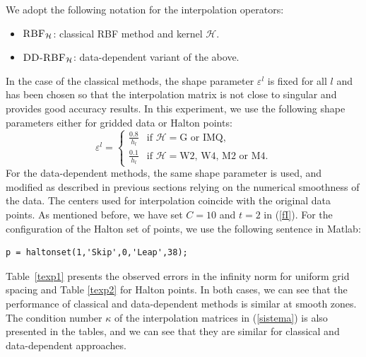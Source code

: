 \documentclass[preprint]{elsarticle}       %
\begin{document}
We adopt the following notation for the interpolation operators:
\begin{itemize}
    \item $\textsc{RBF}_{\mathcal{H}}$: classical RBF method and kernel $\mathcal{H}$.
    \item $\textsc{DD-RBF}_{\mathcal{H}}$: data-dependent variant of the above.
\end{itemize}
In the case of the classical methods, the shape parameter $\varepsilon^l$ is fixed for all $l$ and has been chosen so that the interpolation matrix is not close to singular and provides good accuracy results. In this experiment, we use the following shape parameters either for gridded data or Halton points:
\[
\varepsilon^l = 
\begin{cases}
\frac{0.8}{h_l} & \text{if } \mathcal{H} = \text{G or IMQ}, \\
\frac{0.1}{h_l} & \text{if } \mathcal{H} = \text{W2, W4, M2 or M4}.
\end{cases}
\]
For the data-dependent methods, the same shape parameter is used, and modified as described in previous sections relying on the numerical smoothness of the data. The centers used for interpolation coincide with the original data points. As mentioned before, we have set $C=10$ and $t=2$ in (\ref{fI}). For the configuration of the Halton set of points, we use the following sentence in Matlab:
\vspace{0.5cm}

\begin{lstlisting}
p = haltonset(1,'Skip',0,'Leap',38);
\end{lstlisting}
\vspace{0.5cm}


Table~\ref{texp1} presents the observed errors in the infinity norm for uniform grid spacing and Table \ref{texp2} for Halton points. In both cases, we can see that the performance of classical and data-dependent methods is similar at smooth zones. The condition number $\kappa$ of the interpolation matrices in (\ref{sistema})  is also presented in the tables, and we can see that they are similar for classical and data-dependent approaches.
\end{document}
